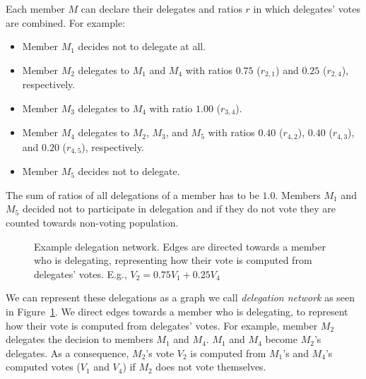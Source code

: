 \documentclass{sigchi}
\begin{document}
Each member $M$ can declare their delegates and ratios $r$ in which delegates' votes are combined. For example:

\begin{itemize}
\item Member $M_1$ decides not to delegate at all.
\item Member $M_2$ delegates to $M_1$ and $M_4$ with ratios $0.75$ ($r_{2,1}$) and $0.25$ ($r_{2,4}$), respectively.
\item Member $M_3$ delegates to $M_4$ with ratio $1.00$ ($r_{3,4}$).
\item Member $M_4$ delegates to $M_2$, $M_3$, and $M_5$ with ratios $0.40$ ($r_{4,2}$), $0.40$ ($r_{4,3}$), and $0.20$ ($r_{4,5}$), respectively.
\item Member $M_5$ decides not to delegate.
\end{itemize}

The sum of ratios of all delegations of a member has to be $1.0$.
Members $M_1$ and $M_5$ decided not to participate in delegation and if they do not vote they are
counted towards non-voting population.

\begin{figure}
  \centering
  \caption{Example delegation network. Edges are directed towards a member who is delegating, representing how their
  vote is computed from delegates' votes. E.g., $V_2 = 0.75 V_1 + 0.25 V_4$}\label{fig:delegation-network}
\end{figure}

We can represent these delegations as a graph we call \emph{delegation network} as seen in
Figure~\ref{fig:delegation-network}.
We direct edges towards a member who is delegating, to represent how their vote is computed from delegates' votes.
For example, member $M_2$ delegates the decision to members $M_1$ and $M_4$.
$M_1$ and $M_4$ become $M_2$'s delegates.
As a consequence, $M_2$'s vote $V_2$ is computed from $M_1$'s and $M_4$'s computed votes ($V_1$ and $V_4$)
if $M_2$ does not vote themselves.
\end{document}
